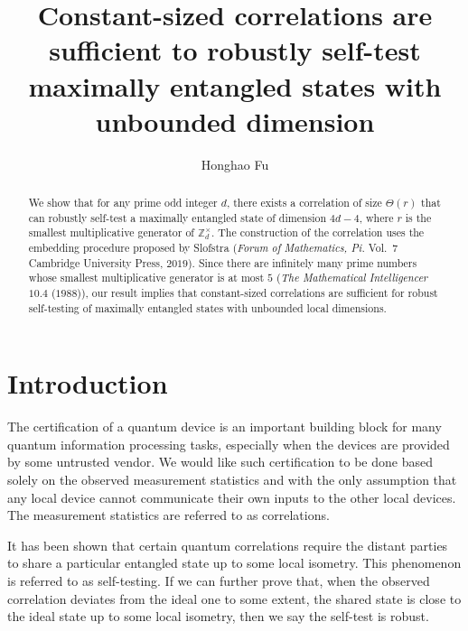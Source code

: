 \documentclass[11pt,letterpaper]{article}
\newcommand{\Z}{\mathbb{Z}}
\newcommand{\Zd}{\Z_d^{\times}}
\newcommand{\1}{\mathbb{1}}
\theoremstyle{definition}
\begin{document}
\title{Constant-sized correlations are sufficient to 
robustly self-test maximally entangled states with unbounded dimension}

\author[1]{Honghao Fu}

\renewcommand\Affilfont{\itshape\small}



\maketitle

\begin{abstract}
	We show that for any prime odd integer $d$, there exists a correlation of size $\Theta(r)$ 
	that can robustly self-test a maximally entangled state of dimension $4d-4$,
	where $r$ is the smallest multiplicative generator of $\Zd$.
	The construction of the correlation uses the embedding procedure
	proposed by Slofstra (\textit{Forum of Mathematics, Pi.} Vol.~$7$ Cambridge University Press, $2019$).
	Since there are 
	infinitely many prime numbers whose smallest multiplicative generator
	is at most $5$ (\textit{The Mathematical Intelligencer} $10.4$ ($1988$)), 
	our result implies that constant-sized correlations are sufficient for robust self-testing of maximally entangled states
	with unbounded local dimensions.
\end{abstract}
\section{Introduction}
\label{sec:intro}
The certification of a quantum device is an important building block
for many quantum information processing tasks, especially
when the devices are provided by some untrusted vendor.
We would like such certification to be done based solely on
the observed measurement statistics and with the only assumption that
any local device cannot communicate their own
inputs to the other local devices. 
The measurement statistics are referred to as correlations.

It has been shown that certain quantum correlations require the distant parties to share
a particular entangled state up to some local isometry. 
This phenomenon is referred to as self-testing.  
If we can further prove that, when the observed correlation deviates 
from the ideal one to some extent, 
the shared state is close to the ideal state up to some local isometry,
then we say the self-test is robust. 
\end{document}
